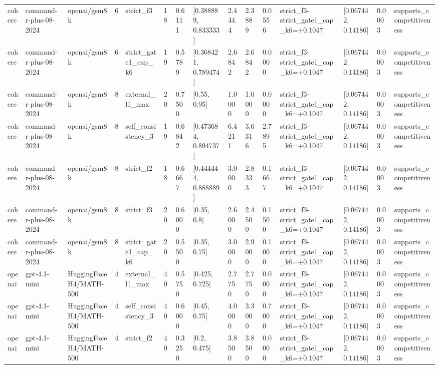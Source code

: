 \begin{tabular}{lllllllllllllll}
cohere & command-r-plus-08-2024 & openai/gsm8k & 6 & strict\_f3 & 18 & 0.6111 & [0.388889, 0.833333] & 2.4444 & 2.3889 & 0.0556 & strict\_f3-strict\_gate1\_cap\_k6=+0.1047 & [0.067442, 0.14186] & 0.0003 & supports\_competitiveness \\
cohere & command-r-plus-08-2024 & openai/gsm8k & 6 & strict\_gate1\_cap\_k6 & 19 & 0.5789 & [0.368421, 0.789474] & 2.6842 & 2.6842 & 0.0000 & strict\_f3-strict\_gate1\_cap\_k6=+0.1047 & [0.067442, 0.14186] & 0.0003 & supports\_competitiveness \\
cohere & command-r-plus-08-2024 & openai/gsm8k & 8 & external\_l1\_max & 20 & 0.7500 & [0.55, 0.95] & 1.0000 & 1.0000 & 0.0000 & strict\_f3-strict\_gate1\_cap\_k6=+0.1047 & [0.067442, 0.14186] & 0.0003 & supports\_competitiveness \\
cohere & command-r-plus-08-2024 & openai/gsm8k & 8 & self\_consistency\_3 & 19 & 0.6842 & [0.473684, 0.894737] & 6.4211 & 3.6316 & 2.7895 & strict\_f3-strict\_gate1\_cap\_k6=+0.1047 & [0.067442, 0.14186] & 0.0003 & supports\_competitiveness \\
cohere & command-r-plus-08-2024 & openai/gsm8k & 8 & strict\_f2 & 18 & 0.6667 & [0.444444, 0.888889] & 3.0000 & 2.8333 & 0.1667 & strict\_f3-strict\_gate1\_cap\_k6=+0.1047 & [0.067442, 0.14186] & 0.0003 & supports\_competitiveness \\
cohere & command-r-plus-08-2024 & openai/gsm8k & 8 & strict\_f3 & 20 & 0.6000 & [0.35, 0.8] & 2.6000 & 2.4500 & 0.1500 & strict\_f3-strict\_gate1\_cap\_k6=+0.1047 & [0.067442, 0.14186] & 0.0003 & supports\_competitiveness \\
cohere & command-r-plus-08-2024 & openai/gsm8k & 8 & strict\_gate1\_cap\_k6 & 20 & 0.5500 & [0.35, 0.75] & 3.0000 & 2.9000 & 0.1000 & strict\_f3-strict\_gate1\_cap\_k6=+0.1047 & [0.067442, 0.14186] & 0.0003 & supports\_competitiveness \\
openai & gpt-4.1-mini & HuggingFaceH4/MATH-500 & 4 & external\_l1\_max & 40 & 0.5750 & [0.425, 0.725] & 2.7750 & 2.7750 & 0.0000 & strict\_f3-strict\_gate1\_cap\_k6=+0.1047 & [0.067442, 0.14186] & 0.0003 & supports\_competitiveness \\
openai & gpt-4.1-mini & HuggingFaceH4/MATH-500 & 4 & self\_consistency\_3 & 40 & 0.6000 & [0.45, 0.75] & 4.0000 & 3.3000 & 0.7000 & strict\_f3-strict\_gate1\_cap\_k6=+0.1047 & [0.067442, 0.14186] & 0.0003 & supports\_competitiveness \\
openai & gpt-4.1-mini & HuggingFaceH4/MATH-500 & 4 & strict\_f2 & 40 & 0.3250 & [0.2, 0.475] & 3.8500 & 3.8500 & 0.0000 & strict\_f3-strict\_gate1\_cap\_k6=+0.1047 & [0.067442, 0.14186] & 0.0003 & supports\_competitiveness \\

\end{tabular}
